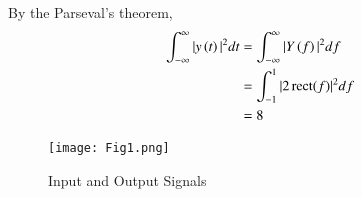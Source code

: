 \documentclass[journal,12pt,twocolumn]{IEEEtran}
\DeclareMathOperator{\rect}{rect}
\begin{document}
By the Parseval's theorem,
\begin{align}
    \int_{-\infty}^{\infty} |y\brak{t}|^{2} dt &= \int_{-\infty}^{\infty} |Y\brak{f}|^{2} df\\
    &= \int_{-1}^{1} |2\rect(f)|^2df\\
    &= 8
\end{align}
\begin{figure}[htp]
    \centering
    \texttt{[image: Fig1.png]}
    \caption{Input and Output Signals}
    \label{fig:plot}
\end{figure}
\end{document}
